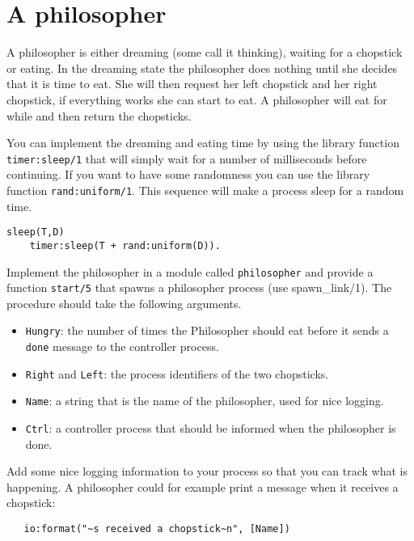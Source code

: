 \documentclass[a4paper,11pt]{article}
\begin{document}
\section{A philosopher}

A philosopher is either dreaming (some call it thinking), waiting for
a chopstick or eating. In the dreaming state the philosopher does
nothing until she decides that it is time to eat. She will then
request her left chopstick and her right chopstick, if everything
works she can start to eat. A philosopher will eat for while and then
return the chopsticks.

You can implement the dreaming and eating time by using the library
function {\tt timer:sleep/1} that will simply wait for a number of
milliseconds before continuing. If you want to have some randomness
you can use the library function {\tt rand:uniform/1}. This sequence
will make a process sleep for a random time.

\begin{verbatim}
sleep(T,D) 
    timer:sleep(T + rand:uniform(D)).
\end{verbatim}


Implement the philosopher in a module called {\tt philosopher} and
provide a function {\tt start/5} that spawns a philosopher
process (use spawn\_link/1). The procedure should take the following arguments.

\begin{itemize}

\item {\tt Hungry}: the number of times the Philosopher should eat
  before it sends a {\tt done} message to the controller process.

\item {\tt Right} and {\tt Left}: the process identifiers of the two
  chopsticks.

\item {\tt Name}: a string that is the name of the philosopher, used
  for nice logging.

\item {\tt Ctrl}: a controller process that should be informed when
  the philosopher is done.
\end{itemize}

Add some nice logging information to your process so that you can
track what is happening. A philosopher could for example print a
message when it receives a chopstick:

\begin{verbatim}
   io:format("~s received a chopstick~n", [Name])
\end{verbatim}
\end{document}
